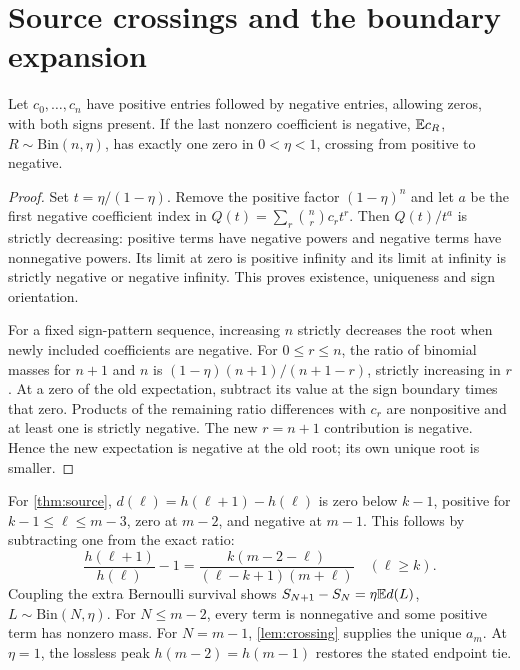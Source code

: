 \section{Source crossings and the boundary expansion}\label{app:source}
\begin{lemma}\label{lem:crossing}
Let $c_0,\ldots,c_n$ have positive entries followed by negative entries, allowing zeros, with both signs present. If the last nonzero coefficient is negative, $\mathbb E c_R$, $R\sim\mathrm{Bin}(n,\eta)$, has exactly one zero in $0<\eta<1$, crossing from positive to negative.
\end{lemma}
\begin{proof}
Set $t=\eta/(1-\eta)$. Remove the positive factor $(1-\eta)^n$ and let $a$ be the first negative coefficient index in $Q(t)=\sum_r\binom nr c_rt^r$. Then $Q(t)/t^a$ is strictly decreasing: positive terms have negative powers and negative terms have nonnegative powers. Its limit at zero is positive infinity and its limit at infinity is strictly negative or negative infinity. This proves existence, uniqueness and sign orientation.

For a fixed sign-pattern sequence, increasing $n$ strictly decreases the root when newly included coefficients are negative. For $0\le r\le n$, the ratio of binomial masses for $n+1$ and $n$ is $(1-\eta)(n+1)/(n+1-r)$, strictly increasing in $r$. At a zero of the old expectation, subtract its value at the sign boundary times that zero. Products of the remaining ratio differences with $c_r$ are nonpositive and at least one is strictly negative. The new $r=n+1$ contribution is negative. Hence the new expectation is negative at the old root; its own unique root is smaller.
\end{proof}

For \cref{thm:source}, $d(\ell)=h(\ell+1)-h(\ell)$ is zero below $k-1$, positive for $k-1\le\ell\le m-3$, zero at $m-2$, and negative at $m-1$. This follows by subtracting one from the exact ratio:
\begin{equation}
 \frac{h(\ell+1)}{h(\ell)}-1=\frac{k(m-2-\ell)}{(\ell-k+1)(m+\ell)}\quad(\ell\ge k).
\end{equation}
Coupling the extra Bernoulli survival shows $S_{N+1}-S_N=\eta\mathbb E d(L)$, $L\sim\mathrm{Bin}(N,\eta)$. For $N\le m-2$, every term is nonnegative and some positive term has nonzero mass. For $N=m-1$, \cref{lem:crossing} supplies the unique $a_m$. At $\eta=1$, the lossless peak $h(m-2)=h(m-1)$ restores the stated endpoint tie.


